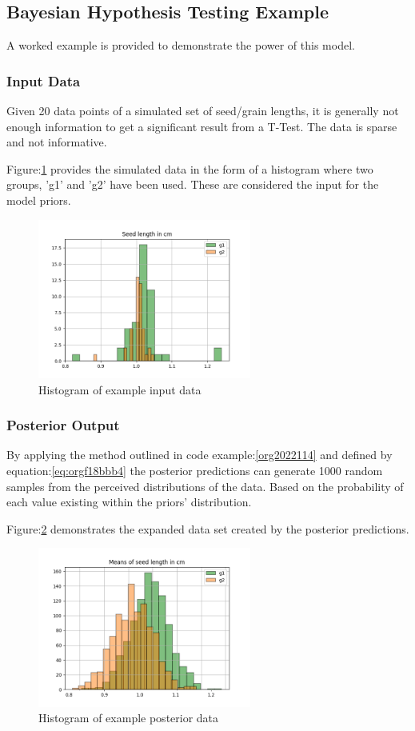 \documentclass[11pt]{report}
\begin{document}
\subsection{Bayesian Hypothesis Testing Example}
\label{sec:orga64f60c}
A worked example is provided to demonstrate the power of this model.
\subsubsection{Input Data}
\label{sec:org77d3866}
Given 20 data points of a simulated set of seed/grain lengths, it is generally not enough information to get a significant result from a T-Test. The data is sparse and not informative.

Figure:\ref{fig:org0447e8c} provides the simulated data in the form of a histogram where two groups, 'g1' and 'g2' have been used. These are considered the input for the model priors.
\begin{figure}[htbp]
\centering
\includegraphics[width=7cm]{./images/exampledata.png}
\caption{\label{fig:org0447e8c}
Histogram of example input data}
\end{figure}

\subsubsection{Posterior Output}
\label{sec:org372bf19}
By applying the method outlined in code example:\ref{org2022114} and defined by equation:\ref{eq:orgf18bbb4} the posterior predictions can generate 1000 random samples from the perceived distributions of the data. Based on the probability of each value existing within the priors' distribution.

Figure:\ref{fig:org3305fbe} demonstrates the expanded data set created by the posterior predictions.
\begin{figure}[htbp]
\centering
\includegraphics[width=7cm]{./images/examplebayes.png}
\caption{\label{fig:org3305fbe}
Histogram of example posterior data}
\end{figure}
\end{document}
